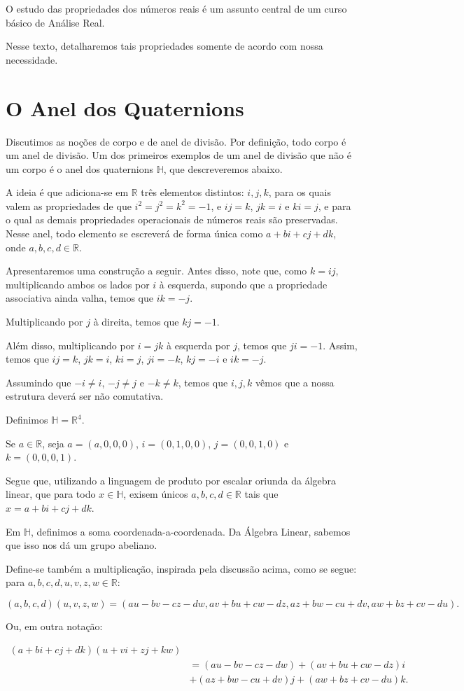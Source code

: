 O estudo das propriedades dos números reais é um assunto central de um curso básico de Análise Real.

Nesse texto, detalharemos tais propriedades somente de acordo com nossa necessidade.

\section{O Anel dos Quaternions}
Discutimos as noções de corpo e de anel de divisão.
Por definição, todo corpo é um anel de divisão.
Um dos primeiros exemplos de um anel de divisão que não é um corpo é o anel dos quaternions $\mathbb H$, que descreveremos abaixo.

A ideia é que adiciona-se em $\mathbb R$ três elementos distintos: $i, j, k$, para os quais valem as propriedades de que $i^2=j^2=k^2=-1$, e $ij=k$, $jk=i$ e $ki=j$, e para o qual as demais propriedades operacionais de números reais são preservadas. Nesse anel, todo elemento se escreverá de forma única como $a+bi+cj+dk$, onde $a,b,c,d\in \mathbb R$.

Apresentaremos uma construção a seguir. Antes disso, note que, como $k=ij$, multiplicando ambos os lados por $i$ à esquerda, supondo que a propriedade associativa ainda valha, temos que $ik=-j$.

Multiplicando por $j$ à direita, temos que $kj=-1$.

Além disso, multiplicando por $i=jk$ à esquerda por $j$, temos que $ji=-1$. Assim, temos que $ij=k$, $jk=i$, $ki=j$, $ji=-k$, $kj=-i$ e $ik=-j$.

Assumindo que $-i\neq i$, $-j\neq j$ e $-k\neq k$, temos que $i,j,k$ vêmos que a nossa estrutura deverá ser não comutativa.

\begin{definition}[Quaternions]
    Definimos $\mathbb H=\mathbb R^4$.
    
    Se $a \in \mathbb R$, seja $a=(a, 0, 0, 0)$, $i=(0, 1, 0, 0)$, $j=(0, 0, 1, 0)$ e $k=(0, 0, 0, 1)$.

    Segue que, utilizando a linguagem de produto por escalar oriunda da álgebra linear, que para todo $x \in \mathbb H$, exisem únicos $a, b, c, d \in \mathbb R$ tais que $x=a+bi+cj+dk$.

    Em $\mathbb H$, definimos a soma coordenada-a-coordenada. Da Álgebra Linear, sabemos que isso nos dá um grupo abeliano.

    Define-se também a multiplicação, inspirada pela discussão acima, como se segue: para $a, b, c, d, u, v, z, w \in \mathbb R$:

    \begin{equation*}
        (a, b, c, d)(u, v, z, w)=(au-bv-cz-dw, av+bu+cw-dz, az+bw-cu+dv, aw+bz+cv-du).
    \end{equation*}

    Ou, em outra notação:

    \begin{align*}
    (a+bi+cj+dk)(u+vi+zj+kw)& \\
    &=(au-bv-cz-dw)+(av+bu+cw-dz)i\\
    &+(az+bw-cu+dv)j+(aw+bz+cv-du)k.
    \end{align*}
\end{definition}

